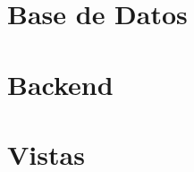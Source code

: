 \documentclass{article}
\begin{document}
\tableofcontents

\listoffigures

\section{Base de Datos}



\section{Backend}



\section{Vistas}


\end{document}
